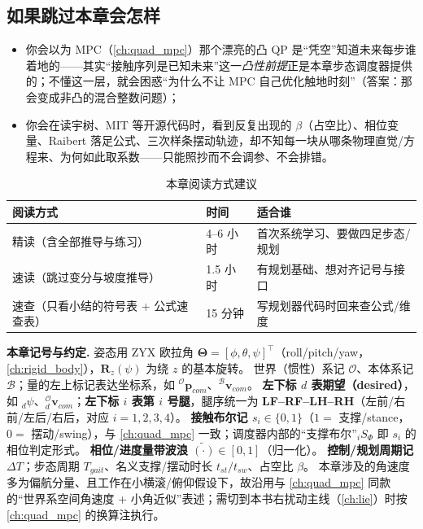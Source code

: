 \subsection*{如果跳过本章会怎样}
\begin{itemize}
  \item 你会以为 MPC（\cref{ch:quad_mpc}）那个漂亮的凸 QP 是“凭空”知道未来每步谁着地的——其实“接触序列是已知未来”这一\emph{凸性前提}正是本章步态调度器提供的；不懂这一层，就会困惑“为什么不让 MPC 自己优化触地时刻”（答案：那会变成非凸的混合整数问题）；
  \item 你会在读宇树、MIT 等开源代码时，看到反复出现的 $\beta$（占空比）、相位变量、Raibert 落足公式、三次样条摆动轨迹，却不知每一块从哪条物理直觉/方程来、为何如此取系数——只能照抄而不会调参、不会排错。
\end{itemize}

\begin{table}[H]\centering\small
\caption{本章阅读方式建议}
\begin{tabular}{lll}
\toprule
阅读方式 & 时间 & 适合谁 \\
\midrule
精读（含全部推导与练习） & 4--6 小时 & 首次系统学习、要做四足步态/规划 \\
速读（跳过变分与坡度推导） & 1.5 小时 & 有规划基础、想对齐记号与接口 \\
速查（只看小结的符号表 + 公式速查表） & 15 分钟 & 写规划器代码时回来查公式/维度 \\
\bottomrule
\end{tabular}
\end{table}

\begin{note}
\textbf{本章记号与约定.}\;
姿态用 ZYX 欧拉角 $\boldsymbol{\Theta}=[\phi,\theta,\psi]^\top$（roll/pitch/yaw，\cref{ch:rigid_body}），$\mathbf{R}_z(\psi)$ 为绕 $z$ 的基本旋转。
世界（惯性）系记 $\mathcal{O}$、本体系记 $\mathcal{B}$；量的左上标记表达坐标系，如 ${}^{\mathcal{O}}\boldsymbol{p}_{com}$、${}^{\mathcal{B}}\boldsymbol{v}_{com}$。
\textbf{左下标 $d$ 表期望（desired）}，如 ${}_d\psi$、${}_d^{\mathcal{O}}\boldsymbol{v}_{com}$；\textbf{左下标 $i$ 表第 $i$ 号腿}，腿序统一为 \textbf{LF–RF–LH–RH}（左前/右前/左后/右后，对应 $i=1,2,3,4$）。
\textbf{接触布尔记 $s_i\in\{0,1\}$}（$1=$ 支撑/stance，$0=$ 摆动/swing），与 \cref{ch:quad_mpc} 一致；调度器内部的“支撑布尔”${}_iS_\Phi$ 即 $s_i$ 的相位判定形式。
\textbf{相位/进度量带波浪 $\tilde{(\cdot)}\in[0,1]$}（归一化）。
\textbf{控制/规划周期记 $\Delta T$}；步态周期 $T_{gait}$、名义支撑/摆动时长 $t_{st}/t_{sw}$、占空比 $\beta$。
本章涉及的角速度多为偏航分量、且工作在小横滚/俯仰假设下，故沿用与 \cref{ch:quad_mpc} 同款的“世界系空间角速度 + 小角近似”表述；需切到本书右扰动主线（\cref{ch:lie}）时按 \cref{ch:quad_mpc} 的换算注执行。
\end{note}

